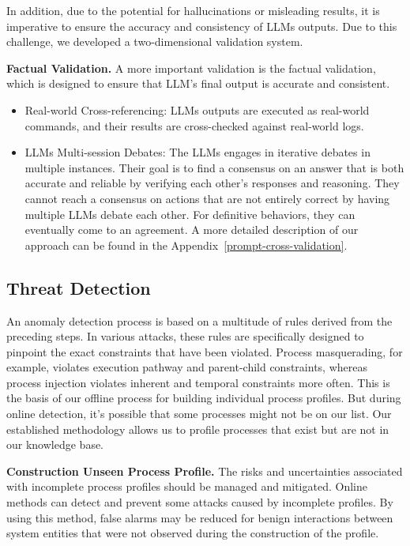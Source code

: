 In addition, due to the potential for hallucinations or misleading results, it is imperative to ensure the accuracy and consistency of LLMs outputs. Due to this challenge, we developed a two-dimensional validation system.

\textbf{Factual Validation.}
A more important validation is the factual validation, which is designed to ensure that LLM's final output is accurate and consistent.

\begin{itemize}
    \item Real-world Cross-referencing: LLMs outputs are executed as real-world commands, and their results are cross-checked against real-world logs.
    \item LLMs Multi-session Debates: The LLMs engages in iterative debates in multiple instances. Their goal is to find a consensus on an answer that is both accurate and reliable by verifying each other's responses and reasoning. They cannot reach a consensus on actions that are not entirely correct by having multiple LLMs debate each other. For definitive behaviors, they can eventually come to an agreement. A more detailed description of our approach can be found in the Appendix~\ref{prompt-cross-validation}.
\end{itemize}



\subsection{Threat Detection}
\label{sec:Threat_detection}
An anomaly detection process is based on a multitude of rules derived from the preceding steps. In various attacks, these rules are specifically designed to pinpoint the exact constraints that have been violated. Process masquerading, for example, violates execution pathway and parent-child constraints, whereas process injection violates inherent and temporal constraints more often. This is the basis of our offline process for building individual process profiles. But during online detection, it's possible that some processes might not be on our list.
Our established methodology allows us to profile processes that exist but are not in our knowledge base.

\textbf{Construction Unseen Process Profile.}
The risks and uncertainties associated with incomplete process profiles should be managed and mitigated. Online methods can detect and prevent some attacks caused by incomplete profiles. By using this method, false alarms may be reduced for benign interactions between system entities that were not observed during the construction of the profile.